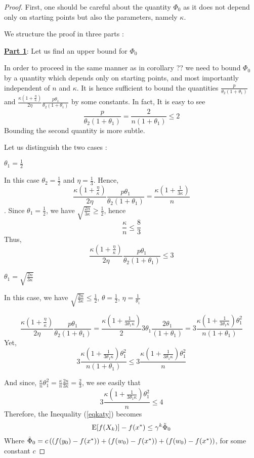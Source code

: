 \documentclass[12pt]{report}
\newcommand{\E}{\mathrm{E}}
\begin{document}
\begin{proof}
First, one should be careful about the quantity $\Phi_0$ as it does not depend only on starting points but also the parameters, namely $\kappa$. 

We structure the proof in three parts :

\textbf{\underline{Part 1}}: Let us find an upper bound for 
    $\Phi_0$
    
In order to proceed in the same manner as in corollary ?? we need to bound $\Phi_0$ by a quantity which depends only on starting points, and most importantly independent of $n$ and $\kappa$. It is hence sufficient to bound the quantities $\frac{p}{\theta_2(1+\theta_1)}$ and $\frac{\kappa(1+\frac{\eta}{\kappa})}{2\eta}\frac{p\theta_1}{\theta_2(1+\theta_1)}$  by some constants. 
In fact,
It is easy to see
$$\frac{p}{\theta_2(1+\theta_1)}=\frac{2}{n(1+\theta_1)}\leq2 $$ 
Bounding the second quantity is more subtle.

Let us distinguish the two cases :

\underline{$\theta_1=\frac{1}{2}$}


In this case $\theta_2=\frac{1}{2}$ and $\eta=\frac{1}{3}$.
Hence,
$$\frac{\kappa(1+\frac{\eta}{\kappa})}{2\eta}\frac{p\theta_1}{\theta_2(1+\theta_1)}=\frac{\kappa(1+\frac{1}{3\kappa})}{n}$$.
Since $\theta_1=\frac{1}{2}$, we have $\sqrt{\frac{2n}{3\kappa}}\geq \frac{1}{2}$, hence
$$\frac{\kappa}{n}\leq \frac{8}{3} $$
Thus,
$$\frac{\kappa(1+\frac{\eta}{\kappa})}{2\eta}\frac{p\theta_1}{\theta_2(1+\theta_1)}\leq 3$$

\underline{$\theta_1=\sqrt{\frac{2n}{3\kappa}}$}

In this case, we have $\sqrt{\frac{2n}{3\kappa}}\leq \frac{1}{2}$, $\theta=\frac{1}{2}$, $\eta=\frac{1}{\theta_1}$

$$\frac{\kappa(1+\frac{\eta}{\kappa})}{2\eta}\frac{p\theta_1}{\theta_2(1+\theta_1)}=\frac{\kappa(1+\frac{1}{3\theta_1\kappa})}{2}3\theta_1\frac{2\theta_1}{(1+\theta_1)}=3\frac{\kappa(1+\frac{1}{3\theta_1\kappa})\theta_1^2}{n(1+\theta_1)}$$
Yet,
$$3\frac{\kappa(1+\frac{1}{3\theta_1\kappa})\theta_1^2}{n(1+\theta_1)}\leq 3\frac{\kappa(1+\frac{1}{3\theta_1\kappa})\theta_1^2}{n}$$

And since,
$\frac{\kappa}{n}\theta_1^2=\frac{\kappa}{n}\frac{2n}{3\kappa}=\frac{2}{3}$, we see easily that 
$$3\frac{\kappa(1+\frac{1}{3\theta_1\kappa})\theta_1^2}{n}\leq 4$$
Therefore, the Inequality (\ref{eqkaty}) becomes $$\E[f(X_k)] -f(x^*)\leq \gamma^k \Tilde{\Phi}_0$$
Where $ \Tilde{\Phi}_0=c\left((f(y_0)-f(x^*))+(f(w_0)-f(x^*))+(f(w_0)-f(x^*)\right)$, for some constant $c$


\end{proof}
\end{document}
